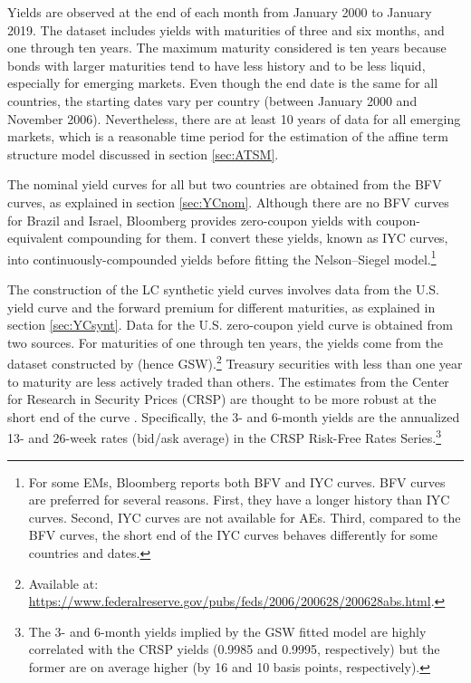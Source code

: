 {Yields are observed at the end of each month from January 2000 to January 2019. 
The dataset includes yields with maturities of three and six months, and one through ten years. 
The maximum maturity considered is ten years because bonds with larger maturities tend to have less history and to be less liquid, especially for emerging markets.
Even though the end date is the same for all countries, the starting dates vary per country (between January 2000 and November 2006). 
Nevertheless, there are at least 10 years of data for all emerging markets, which is a reasonable time period for the estimation of the affine term structure model discussed in section \ref{sec:ATSM}.
%	

The nominal yield curves for all but two countries are obtained from the BFV curves, as explained in section \ref{sec:YCnom}. 
Although there are no BFV curves for Brazil and Israel, Bloomberg provides zero-coupon yields with coupon-equivalent compounding for them.
I convert these yields, known as IYC curves, into continuously-compounded yields before fitting the Nelson--Siegel model.\footnote{ For some EMs, Bloomberg reports both BFV and IYC curves. BFV curves are preferred for several reasons. First, they have a longer history than IYC curves. Second, IYC curves are not available for AEs. Third, compared to the BFV curves, the short end of the IYC curves behaves differently for some countries and dates.} 

The construction of the LC synthetic yield curves involves data from the U.S. yield curve and the forward premium for different maturities, as explained in section \ref{sec:YCsynt}. 
Data for the U.S. zero-coupon yield curve is obtained from two sources. 
For maturities of one through ten years, the yields come from the dataset constructed by \cite*{GSW:2007} (hence GSW).\footnote{Available at: \url{https://www.federalreserve.gov/pubs/feds/2006/200628/200628abs.html}.} 
Treasury securities with less than one year to maturity are less actively traded than others. 
The estimates from the Center for Research in Security Prices (CRSP) are thought to be more robust at the short end of the curve \citep[see][]{GolinskiSpencer:2019}.
Specifically, the 3- and 6-month yields are the annualized 13- and 26-week rates (bid/ask average) in the CRSP Risk-Free Rates Series.\footnote{ The 3- and 6-month yields implied by the GSW fitted model are highly correlated with the CRSP yields (0.9985 and 0.9995, respectively) but the former are on average higher (by 16 and 10 basis points, respectively).} 

}
